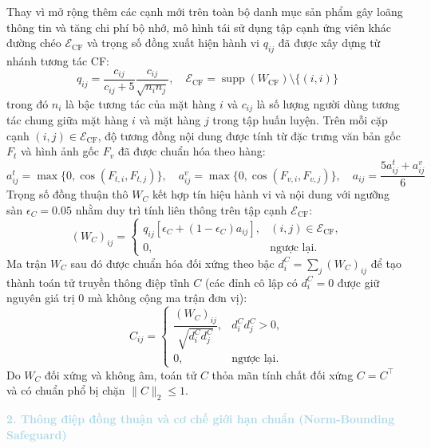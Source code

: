 Thay vì mở rộng thêm các cạnh mới trên toàn bộ danh mục sản phẩm gây loãng thông tin và tăng chi phí bộ nhớ, mô hình tái sử dụng tập cạnh ứng viên khác đường chéo $\mathcal{E}_{\text{CF}}$ và trọng số đồng xuất hiện hành vi $q_{ij}$ đã được xây dựng từ nhánh tương tác CF:
\begin{equation}
q_{ij} = \frac{c_{ij}}{c_{ij} + 5} \frac{c_{ij}}{\sqrt{n_i n_j}}, \quad \mathcal{E}_{\text{CF}} = \operatorname{supp}(W_{\text{CF}}) \setminus \{(i,i)\}
\end{equation}
trong đó $n_i$ là bậc tương tác của mặt hàng $i$ và $c_{ij}$ là số lượng người dùng tương tác chung giữa mặt hàng $i$ và mặt hàng $j$ trong tập huấn luyện. Trên mỗi cặp cạnh $(i,j) \in \mathcal{E}_{\text{CF}}$, độ tương đồng nội dung được tính từ đặc trưng văn bản gốc $F_t$ và hình ảnh gốc $F_v$ đã được chuẩn hóa theo hàng:
\begin{equation}
a_{ij}^t = \max\{0, \cos(F_{t,i}, F_{t,j})\}, \quad a_{ij}^v = \max\{0, \cos(F_{v,i}, F_{v,j})\}, \quad a_{ij} = \frac{5a_{ij}^t + a_{ij}^v}{6}
\end{equation}
Trọng số đồng thuận thô $W_C$ kết hợp tín hiệu hành vi và nội dung với ngưỡng sàn $\epsilon_C = 0.05$ nhằm duy trì tính liên thông trên tập cạnh $\mathcal{E}_{\text{CF}}$:
\begin{equation}
(W_C)_{ij} = \begin{cases}
q_{ij}[\epsilon_C + (1 - \epsilon_C)a_{ij}], & (i,j) \in \mathcal{E}_{\text{CF}}, \\
0, & \text{ngược lại}.
\end{cases}
\end{equation}
Ma trận $W_C$ sau đó được chuẩn hóa đối xứng theo bậc $d_i^C = \sum_j (W_C)_{ij}$ để tạo thành toán tử truyền thông điệp tĩnh $C$ (các đỉnh cô lập có $d_i^C = 0$ được giữ nguyên giá trị 0 mà không cộng ma trận đơn vị):
\begin{equation}
C_{ij} = \begin{cases}
\dfrac{(W_C)_{ij}}{\sqrt{d_i^C d_j^C}}, & d_i^C d_j^C > 0, \\
0, & \text{ngược lại}.
\end{cases}
\end{equation}
Do $W_C$ đối xứng và không âm, toán tử $C$ thỏa mãn tính chất đối xứng $C = C^\top$ và có chuẩn phổ bị chặn $\|C\|_2 \le 1$.

\noindent\textcolor{lightblue}{\textbf{2. Thông điệp đồng thuận và cơ chế giới hạn chuẩn (Norm-Bounding Safeguard)}}

